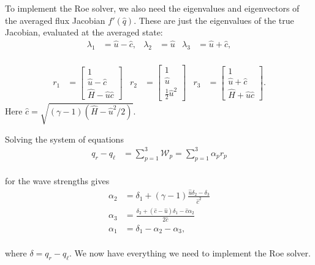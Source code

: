 \documentclass{SIAMbook2016}
\begin{document}
To implement the Roe solver, we also need the eigenvalues and
eigenvectors of the averaged flux Jacobian \(f'(\hat{q})\). These are
just the eigenvalues of the true Jacobian, evaluated at the averaged
state: \begin{align}
    \lambda_1 & = \hat{u} - \hat{c}, & \lambda_2 & = \hat{u} & \lambda_3 & = \hat{u} + \hat{c},
\end{align}\\
\begin{align}
r_1 & = \begin{bmatrix} 1 \\ \hat{u}-\hat{c} \\ \hat{H}-\hat{u}\hat{c}\end{bmatrix} &
r_2 & = \begin{bmatrix} 1 \\ \hat{u} \\ \frac{1}{2}\hat{u}^2 \end{bmatrix} &
r_3 & = \begin{bmatrix} 1 \\ \hat{u}+\hat{c} \\ \hat{H}+\hat{u}\hat{c}\end{bmatrix}.
\end{align} Here \(\hat{c} = \sqrt{(\gamma-1)(\hat{H}-\hat{u}^2/2)}\).

Solving the system of equations \begin{align}
q_r - q_\ell & = \sum_{p=1}^3 {\mathcal W}_p = \sum_{p=1}^3 \alpha_p r_p
\end{align}\\
for the wave strengths gives \begin{align}
    \alpha_2 & = \delta_1 + (\gamma-1)\frac{\hat{u}\delta_2 - \delta_3}{\hat{c}^2} \\
    \alpha_3 & = \frac{\delta_2 + (\hat{c}-\hat{u})\delta_1 - \hat{c}\alpha_2}{2\hat{c}} \\
    \alpha_1 & = \delta_1 - \alpha_2 - \alpha_3,
\end{align}\\
where \(\delta = q_r - q_\ell\). We now have everything we need to
implement the Roe solver.
\end{document}
